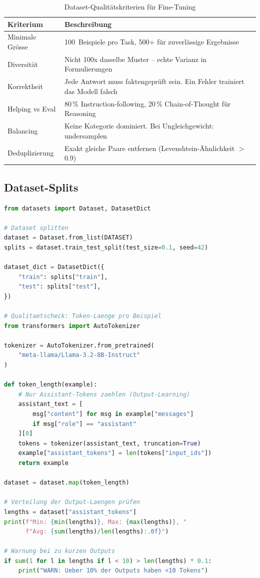 \begin{table}[H]
\centering
\begin{tabularx}{\linewidth}{lX}
\toprule
\textbf{Kriterium} & \textbf{Beschreibung} \\
\midrule
Minimale Grösse & 100~Beispiele pro Task, 500+ für zuverlässige Ergebnisse \\
Diversität & Nicht 100x dasselbe Muster -- echte Varianz in Formulierungen \\
Korrektheit & Jede Antwort muss faktengeprüft sein. Ein Fehler trainiert das Modell falsch \\
Helping vs Eval & 80\,\% Instruction-following, 20\,\% Chain-of-Thought für Reasoning \\
Balancing & Keine Kategorie dominiert. Bei Ungleichgewicht: undersamplen \\
Deduplizierung & Exakt gleiche Paare entfernen (Levenshtein-Ähnlichkeit $>$ 0.9) \\
\bottomrule
\end{tabularx}
\caption{Dataset-Qualitätskriterien für Fine-Tuning}
\protect\label{tab:datasetquality}
\end{table}


\subsection{Dataset-Splits}

\begin{lstlisting}[language=Python, caption=Dataset-Validierung und Splits]
from datasets import Dataset, DatasetDict

# Dataset splitten
dataset = Dataset.from_list(DATASET)
splits = dataset.train_test_split(test_size=0.1, seed=42)

dataset_dict = DatasetDict({
    "train": splits["train"],
    "test": splits["test"],
})

# Qualitaetscheck: Token-Laenge pro Beispiel
from transformers import AutoTokenizer

tokenizer = AutoTokenizer.from_pretrained(
    "meta-llama/Llama-3.2-8B-Instruct"
)

def token_length(example):
    # Nur Assistant-Tokens zaehlen (Output-Learning)
    assistant_text = [
        msg["content"] for msg in example["messages"]
        if msg["role"] == "assistant"
    ][0]
    tokens = tokenizer(assistant_text, truncation=True)
    example["assistant_tokens"] = len(tokens["input_ids"])
    return example

dataset = dataset.map(token_length)

# Verteilung der Output-Laengen prüfen
lengths = dataset["assistant_tokens"]
print(f"Min: {min(lengths)}, Max: {max(lengths)}, "
      f"Avg: {sum(lengths)/len(lengths):.0f}")

# Warnung bei zu kurzen Outputs
if sum(1 for l in lengths if l < 10) > len(lengths) * 0.1:
    print("WARN: Ueber 10% der Outputs haben <10 Tokens")
\end{lstlisting}

